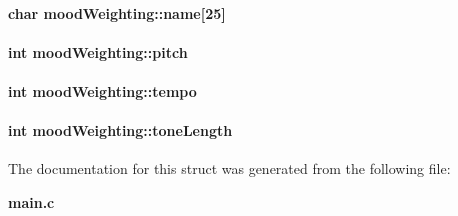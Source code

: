\paragraph[{name}]{\setlength{\rightskip}{0pt plus 5cm}char mood\+Weighting\+::name[25]}\label{structmood_weighting_af578d935b7734ea6944946a2ad9132af}
\paragraph[{pitch}]{\setlength{\rightskip}{0pt plus 5cm}int mood\+Weighting\+::pitch}\label{structmood_weighting_a27410ec4f299961816407657a3e241e8}
\paragraph[{tempo}]{\setlength{\rightskip}{0pt plus 5cm}int mood\+Weighting\+::tempo}\label{structmood_weighting_a9b2180e8a4aab163ae48d0a66269a840}
\paragraph[{tone\+Length}]{\setlength{\rightskip}{0pt plus 5cm}int mood\+Weighting\+::tone\+Length}\label{structmood_weighting_ab9e917ae02761f06d11c59645a45536d}


The documentation for this struct was generated from the following file\+:\begin{DoxyCompactItemize}
\item 
{\bf main.\+c}\end{DoxyCompactItemize}
